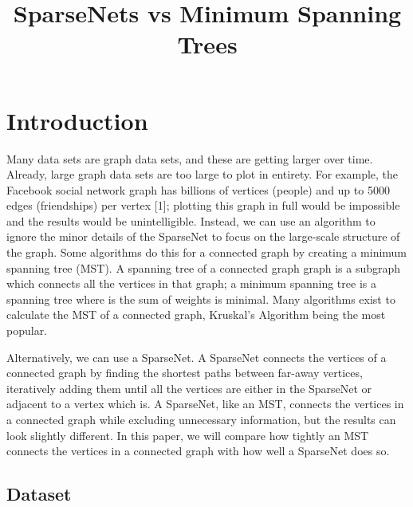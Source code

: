 \documentclass[conference]{IEEEtran}
\begin{document}
\title{SparseNets vs Minimum Spanning Trees}

\author{
}

\maketitle

\section{Introduction}

Many data sets are graph data sets, and these are getting larger over time.
Already, large graph data sets are too large to plot in entirety.
For example, the Facebook social network graph has billions of vertices (people) and up to 5000 edges (friendships) per vertex [1]; plotting this graph in full would be impossible and the results would be unintelligible.
Instead, we can use an algorithm to ignore the minor details of the SparseNet to focus on the large-scale structure of the graph.
Some algorithms do this for a connected graph by creating a minimum spanning tree (MST).
A spanning tree of a connected graph graph is a subgraph which connects all the vertices in that graph; a minimum spanning tree is a spanning tree where is the sum of weights is minimal.
Many algorithms exist to calculate the MST of a connected graph, Kruskal's Algorithm being the most popular.

Alternatively, we can use a SparseNet.
A SparseNet connects the vertices of a connected graph by finding the shortest paths between far-away vertices, iteratively adding them until all the vertices are either in the SparseNet or adjacent to a vertex which is.
A SparseNet, like an MST, connects the vertices in a connected graph while excluding unnecessary information, but the results can look slightly different.
In this paper, we will compare how tightly an MST connects the vertices in a connected graph with how well a SparseNet does so.


\subsection{Dataset}
\end{document}
